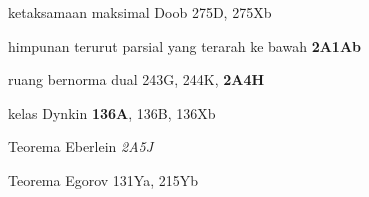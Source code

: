 ketaksamaan maksimal Doob 275D, 275Xb


























himpunan terurut parsial yang terarah ke bawah
{\bf 2A1Ab}





















ruang bernorma dual 243G, 244K, {\bf 2A4H}





























kelas Dynkin {\bf 136A}, 136B, 136Xb




\indexmedskip



Teorema Eberlein {\it 2A5J}















Teorema Egorov 131Ya, 215Yb
  





















